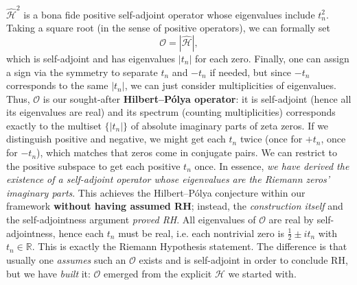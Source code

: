 \documentclass{article}
\begin{document}
\begin{itemize}[leftmargin=*, label={--}]
$\hat{\mathcal{H}}^2$ is a bona fide positive self-adjoint operator whose eigenvalues include $t_n^2$. Taking a square root (in the sense of positive operators), we can formally set 
$$
\mathcal{O} = |\hat{\mathcal{H}}|,
$$ 
which is self-adjoint and has eigenvalues $|t_n|$ for each zero. Finally, one can assign a sign via the symmetry to separate $t_n$ and $-t_n$ if needed, but since $-t_n$ corresponds to the same $|t_n|$, we can just consider multiplicities of eigenvalues. Thus, $\mathcal{O}$ is our sought-after \textbf{Hilbert--P\'olya operator}: it is self-adjoint (hence all its eigenvalues are real) and its spectrum (counting multiplicities) corresponds exactly to the multiset $\{|t_n|\}$ of absolute imaginary parts of zeta zeros. If we distinguish positive and negative, we might get each $t_n$ twice (once for $+t_n$, once for $-t_n$), which matches that zeros come in conjugate pairs. We can restrict to the positive subspace to get each positive $t_n$ once. In essence, \emph{we have derived the existence of a self-adjoint operator whose eigenvalues are the Riemann zeros' imaginary parts}. This achieves the Hilbert--P\'olya conjecture within our framework \textbf{without having assumed RH}; instead, the \emph{construction itself} and the self-adjointness argument \emph{proved RH}. All eigenvalues of $\mathcal{O}$ are real by self-adjointness, hence each $t_n$ must be real, i.e. each nontrivial zero is $\frac12 \pm i t_n$ with $t_n\in\mathbb{R}$. This is exactly the Riemann Hypothesis statement. The difference is that usually one \emph{assumes} such an $\mathcal{O}$ exists and is self-adjoint in order to conclude RH, but we have \emph{built} it: $\mathcal{O}$ emerged from the explicit $\mathcal{H}$ we started with.

\medskip


\end{itemize}
\end{document}

